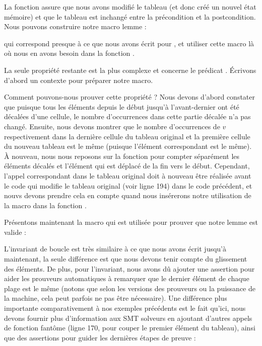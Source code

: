 

La fonction  assure que nous avons
modifié le tableau (et donc créé un nouvel état mémoire) et que le tableau est
inchangé entre la précondition et la postcondition. Nous pouvons construire
notre macro lemme :




qui correspond presque à ce que nous avons écrit pour ,
et utiliser cette macro là où nous en avons besoin dans la fonction
.




La seule propriété restante est la plus complexe et concerne le prédicat
. Écrivons d'abord un contexte pour préparer notre
macro.




Comment pouvons-nous prouver cette propriété ? Nous devons d'abord constater
que puisque tous les éléments depuis le début jusqu'à l'avant-dernier ont été
décalées d'une cellule, le nombre d'occurrences dans cette partie décalée n'a
pas changé. Ensuite, nous devons montrer que le nombre d'occurrences de $v$
respectivement dans la dernière cellule du tableau original et la première
cellule du nouveau tableau est le même (puisque l'élément correspondant est le
même). À nouveau, nous nous reposons sur la fonction  pour compter
séparément les éléments décalés et l'élément qui est déplacé de la fin vers le
début. Cependant, l'appel correspondant dans le tableau original doit à nouveau
être réalisée avant le code qui modifie le tableau original (voir ligne 194) dans
le code précédent, et nouvs devons prendre cela en compte quand nous insérerons
notre utilisation de la macro dans la fonction .


Présentons maintenant la macro qui est utilisée pour prouver que notre lemme
est valide :




L'invariant de boucle est très similaire à ce que nous avons écrit jusqu'à
maintenant, la seule différence est que nous devons tenir compte du glissement
des éléments. De plus, pour l'invariant, nous avons dû ajouter une assertion
pour aider les prouveurs automatiques à remarquer que le dernier élément de
chaque plage est le même (notons que selon les versions des prouveurs ou la
puissance de la machine, cela peut parfois ne pas être nécessaire). Une différence
plus importante comparativement à nos exemples précédents est le fait qu'ici, nous
devons fournir plus d'information aux SMT solveurs en ajoutant d'autres appels
de fonction fantôme (ligne 170, pour couper le premier élément du tableau), ainsi
que des assertions pour guider les dernières étapes de preuve :


